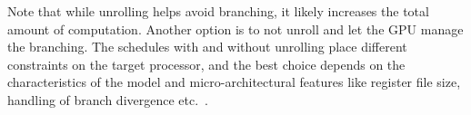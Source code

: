 Note that while unrolling helps avoid branching, it likely increases 
the total amount of computation. Another option is to not unroll 
and let the GPU manage the branching. The schedules with and 
without unrolling place different constraints on the target processor,
and the best choice depends on the characteristics of the model
and micro-architectural features like register file size, handling 
of branch divergence etc.~\cite{FungMicro11, SomethingElse}.


